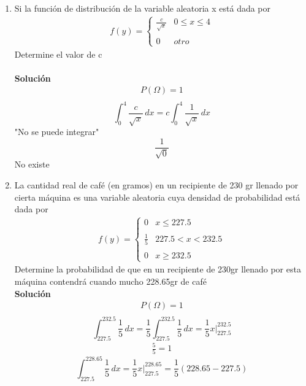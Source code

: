 \begin{enumerate}
    \item Si la función de distribución de la variable aleatoria x está dada por
    \begin{gather*}
    f(y)= \left\{ \begin{array}{lcc}
    \frac{c}{\sqrt{x}} & 0 \leq x \leq 4\\
    \\ 0 & otro 
    \end{array}
    \right.
    \end{gather*}
    Determine el valor de c\\
    \\\textbf{Solución}
    \\
    \begin{gather*}
    P(\Omega)=1\\ 
    \end{gather*}
    \[ \int_{0}^{4}  \! \frac{c}{\sqrt{x}} \, dx =
    c\int_{0}^{4}  \! \frac{1}{\sqrt{x}} \, dx 
    \]
    "No se puede integrar"
    \[ \frac{1}{\sqrt{0}}
    \] No existe
    \item La cantidad real de café (en gramos) en un recipiente de 230 gr llenado por cierta máquina es una variable aleatoria cuya densidad de probabilidad está dada por
    \begin{gather*}
    f(y)= \left\{ \begin{array}{lcc}
    0 & x \leq 227.5\\
    \\ \frac{1}{5} & 227.5 < x < 232.5 \\
    \\ 0 & x \geq 232.5
    \end{array}
    \right.
    \end{gather*}
    Determine la probabilidad de que en un recipiente de 230gr llenado por esta máquina contendrá cuando mucho 228.65gr de café
    \\\textbf{Solución}
    \\
    \begin{gather*}
    P(\Omega)=1\\ 
    \end{gather*}
    \[ \int_{227.5}^{232.5}  \! \frac{1}{5} \, dx =
    \frac{1}{5}\int_{227.5}^{232.5}  \! \frac{1}{5} \, dx = \frac{1}{5}x |_{227.5}^{232.5}
    \] 
    \begin{gather*}
    \frac{5}{5}=1
    \end{gather*}
    \[ \int_{227.5}^{228.65}  \! \frac{1}{5} \, dx = \frac{1}{5}x |_{227.5}^{228.65} = \frac{1}{5}(228.65-227.5)
\]
\end{enumerate}
